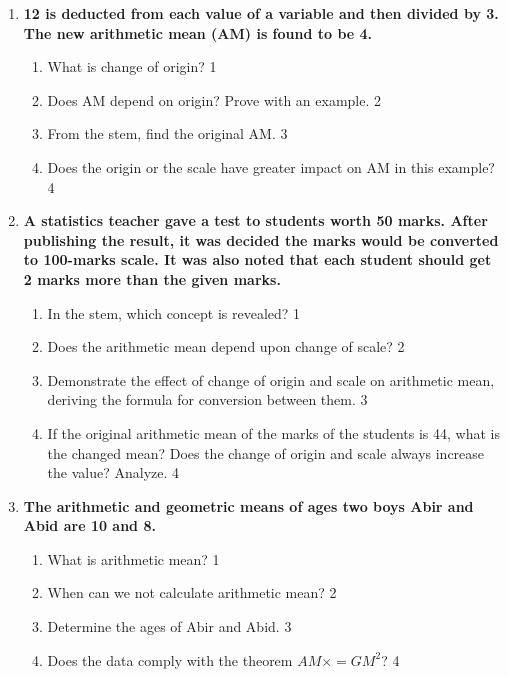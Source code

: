 \documentclass[a4paper,oneside]{book}
\begin{document}
\begin{enumerate}
  
   \item
	  \textbf{12 is deducted from each value of a variable and then divided by 3. The new arithmetic mean (AM) is found to be 4.} 
  
  \begin{enumerate}
    \item
	What is change of origin? \hfill 1
    \item
	Does AM depend on origin? Prove with an example. \hfill 2
    \item  
	From the stem, find the original AM. \hfill 3
    \item
	Does the origin or the scale have greater impact on AM in this example? \hfill 4
  \end{enumerate}
  
   \item
	  \textbf{A statistics teacher gave a test to students worth 50 marks. After publishing the result, it was decided the marks would be converted to 100-marks scale. It was also noted that each student should get 2 marks more than the given marks.} 
  
  \begin{enumerate}
    \item
	In the stem, which concept is revealed? \hfill 1
    \item
	Does the arithmetic mean depend upon change of scale? \hfill 2
    \item  
	Demonstrate the effect of change of origin and scale on arithmetic mean, deriving the formula for conversion between them. \hfill 3
    \item 
    If the original arithmetic mean of the marks of the students is 44, what is the changed mean? Does the change of origin and scale always increase the value? Analyze.
	 \hfill 4
  \end{enumerate}

   \item
	  \textbf{The arithmetic and geometric means of ages two boys Abir and Abid are 10 and 8.} 
  
  \begin{enumerate}
    \item
	What is arithmetic mean? \hfill 1
    \item
	When can we not calculate arithmetic mean? \hfill 2
    \item  
	Determine the ages of Abir and Abid. \hfill 3
    \item
	Does the data comply with the theorem $\displaystyle AM \times  = GM^2$? \hfill 4
  \end{enumerate}
  

\end{enumerate}
\end{document}
